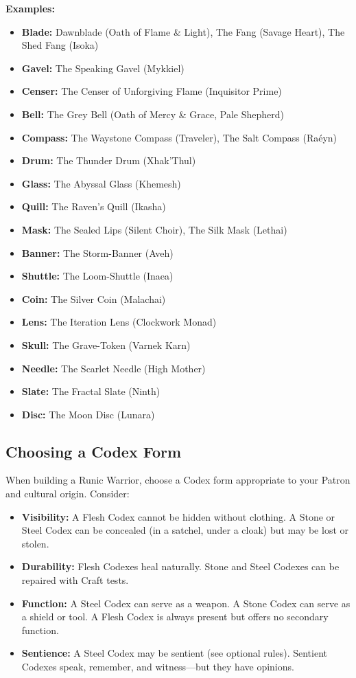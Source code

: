 \textbf{Examples:}
\begin{itemize}
\item \textbf{Blade:} Dawnblade (Oath of Flame \& Light), The Fang (Savage Heart), The Shed Fang (Isoka)
\item \textbf{Gavel:} The Speaking Gavel (Mykkiel)
\item \textbf{Censer:} The Censer of Unforgiving Flame (Inquisitor Prime)
\item \textbf{Bell:} The Grey Bell (Oath of Mercy \& Grace, Pale Shepherd)
\item \textbf{Compass:} The Waystone Compass (Traveler), The Salt Compass (Raéyn)
\item \textbf{Drum:} The Thunder Drum (Xhak'Thul)
\item \textbf{Glass:} The Abyssal Glass (Khemesh)
\item \textbf{Quill:} The Raven's Quill (Ikasha)
\item \textbf{Mask:} The Sealed Lips (Silent Choir), The Silk Mask (Lethai)
\item \textbf{Banner:} The Storm-Banner (Aveh)
\item \textbf{Shuttle:} The Loom-Shuttle (Inaea)
\item \textbf{Coin:} The Silver Coin (Malachai)
\item \textbf{Lens:} The Iteration Lens (Clockwork Monad)
\item \textbf{Skull:} The Grave-Token (Varnek Karn)
\item \textbf{Needle:} The Scarlet Needle (High Mother)
\item \textbf{Slate:} The Fractal Slate (Ninth)
\item \textbf{Disc:} The Moon Disc (Lunara)
\end{itemize}

\subsection*{Choosing a Codex Form}

When building a Runic Warrior, choose a Codex form appropriate to your Patron and cultural origin. Consider:

\begin{itemize}
\item \textbf{Visibility:} A Flesh Codex cannot be hidden without clothing. A Stone or Steel Codex can be concealed (in a satchel, under a cloak) but may be lost or stolen.
\item \textbf{Durability:} Flesh Codexes heal naturally. Stone and Steel Codexes can be repaired with Craft tests.
\item \textbf{Function:} A Steel Codex can serve as a weapon. A Stone Codex can serve as a shield or tool. A Flesh Codex is always present but offers no secondary function.
\item \textbf{Sentience:} A Steel Codex may be sentient (see optional rules). Sentient Codexes speak, remember, and witness—but they have opinions.
\end{itemize}

